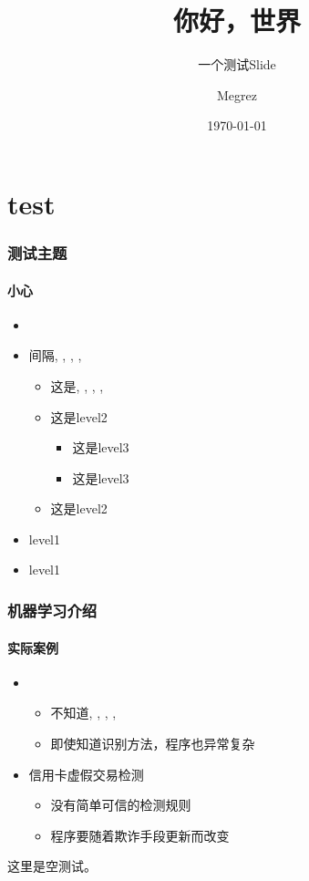 \documentclass[t,12pt]{beamer}
\begin{document}
\title{你好，世界}
\subtitle{\longdash 一个测试Slide}
\author[del2z]{Megrez}
\date{\today}

\begin{frame}
\titlepage
\end{frame}

\section{test}
\begin{frame}
\frametitle{测试主题}
\framesubtitle{小心}
\setlength\partopsep{3pt}

\begin{itemize}
  \setlength\topsep{3pt}
  \item<1-> 
  \item<2-> 间隔\the\itemsep, \the\parsep, \the\partopsep, \the\parskip, \the\topsep
  \begin{itemize}
    \item 这是\the\itemsep, \the\parsep, \the\partopsep, \the\parskip, \the\topsep
    \item 这是level2
    \begin{itemize}
      \item 这是level3
      \item 这是level3
    \end{itemize}
    \item 这是level2
  \end{itemize}
  \item<2-> level1
  \item<2-> level1
\end{itemize}
\end{frame}

\begin{frame}
\frametitle{机器学习介绍}
\framesubtitle{实际案例}
\setlength\partopsep{3pt}

\begin{itemize}
  \setlength\topsep{3pt}
  \item<1-> 
  \vskip 0pt
  \begin{itemize}
    \item 不知道\the\itemsep, \the\parsep, \the\partopsep, \the\parskip, \the\topsep
    \item 即使知道识别方法，程序也异常复杂
  \end{itemize}
  \item<2-> 信用卡虚假交易检测
  \begin{itemize}
    \item 没有简单可信的检测规则
    \item 程序要随着欺诈手段更新而改变
  \end{itemize}
\end{itemize}
\end{frame}

\begin{frame}
这里是空测试。
\end{frame}

\begin{frame}
\lastpage
\end{frame}
\end{document}
